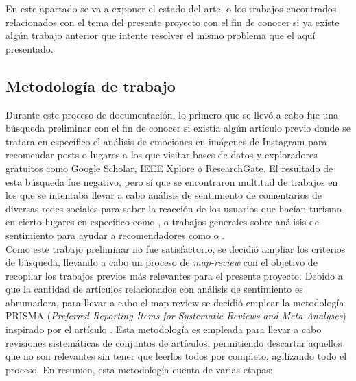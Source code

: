 

En este apartado se va a exponer el estado del arte, o los trabajos encontrados relacionados con el tema del presente proyecto con el fin de conocer si ya existe algún trabajo anterior que intente resolver el mismo problema que el aquí presentado.\\

\subsection{Metodología de trabajo}

Durante este proceso de documentación, lo primero que se llevó a cabo fue una búsqueda preliminar con el fin de conocer si existía algún artículo previo donde se tratara en específico el análisis de emociones en imágenes de Instagram para recomendar posts o lugares a los que visitar bases de datos y exploradores gratuitos como Google Scholar, IEEE Xplore o ResearchGate. El resultado de esta búsqueda fue negativo, pero sí que se encontraron multitud de trabajos en los que se intentaba llevar a cabo análisis de sentimiento de comentarios de diversas redes sociales para saber la reacción de los usuarios que hacían turismo en cierto lugares en específico como \cite{8720960}, o trabajos generales sobre análisis de sentimiento para ayudar a recomendadores como \cite{techniques_media_based_recom} o \cite{recom_sys_sen_analysis}.\\

Como este trabajo preliminar no fue satisfactorio, se decidió ampliar los criterios de búsqueda, llevando a cabo un proceso de \textit{map-review} con el objetivo de recopilar los trabajos previos más relevantes para el presente proyecto. Debido a que la cantidad de artículos relacionados con análisis de sentimiento es abrumadora, para llevar a cabo el map-review se decidió emplear la metodología PRISMA (\textit{Preferred Reporting Items for Systematic Reviews and Meta-Analyses}) inspirado por el artículo \cite{recom_metodo_tutor}. Esta metodología es empleada para llevar a cabo revisiones sistemáticas de conjuntos de artículos, permitiendo descartar aquellos que no son relevantes sin tener que leerlos todos por completo, agilizando todo el proceso. En resumen, esta metodología cuenta de varias etapas:

